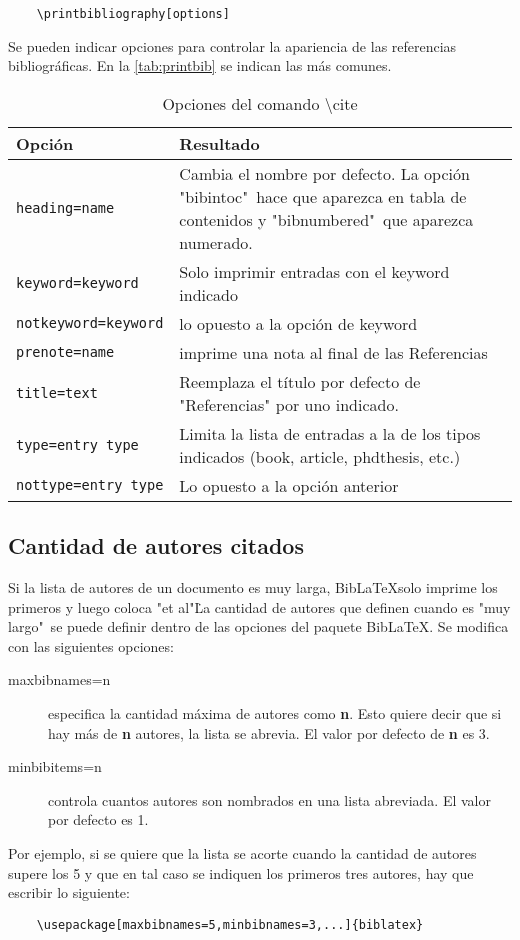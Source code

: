 \begin{lstlisting}
	\printbibliography[options]
\end{lstlisting}

Se pueden indicar opciones para controlar la apariencia de las referencias bibliográficas. En la \autoref{tab:printbib} se indican las más comunes.

\begin{table}[h] 
	\centering
	\caption{Opciones del comando \textbackslash cite{}}
	\begin{tabular}{lp{11cm}}
		\toprule Opción					& 	Resultado \\ 
		\midrule \verb|heading=name| 	& 	Cambia el nombre por defecto. La opción "bibintoc"\ hace que aparezca en tabla de contenidos y "bibnumbered"\ que aparezca numerado. \\
		\verb|keyword=keyword| 			& 	Solo imprimir entradas con el keyword indicado \\
		\verb|notkeyword=keyword| 		& 	lo opuesto a la opción de keyword \\
		\verb|prenote=name|		 		& 	imprime una nota al final de las Referencias\\
		\verb|title=text|		 		& 	Reemplaza el título por defecto de "Referencias" por uno indicado. \\
		\verb|type=entry type| 			& 	Limita la lista de entradas a la de los tipos indicados (book, article, phdthesis, etc.)\\
		\verb|nottype=entry type| 		& 	Lo opuesto a la opción anterior \\
		\bottomrule
	\end{tabular}
	\label{tab:printbib}
\end{table}

\subsection{Cantidad de autores citados}
Si la lista de autores de un documento es muy larga, Bib\LaTeX solo imprime los primeros y luego coloca "et al"\. La cantidad de autores que definen cuando es "muy largo"\ se puede definir dentro de las opciones del paquete Bib\LaTeX. Se modifica con las siguientes opciones:
\begin{description}
	\item[maxbibnames=n] especifica la cantidad máxima de autores como \textbf{n}. Esto quiere decir que si hay más de \textbf{n} autores, la lista se abrevia. El valor por defecto de \textbf{n} es 3.
	\item[minbibitems=n] controla cuantos autores son nombrados en una lista abreviada. El valor por defecto es 1.
\end{description}

Por ejemplo, si se quiere que la lista se acorte cuando la cantidad de autores supere los 5 y que en tal caso se indiquen los primeros tres autores, hay que escribir lo siguiente:
\begin{lstlisting}
	\usepackage[maxbibnames=5,minbibnames=3,...]{biblatex}
\end{lstlisting}

